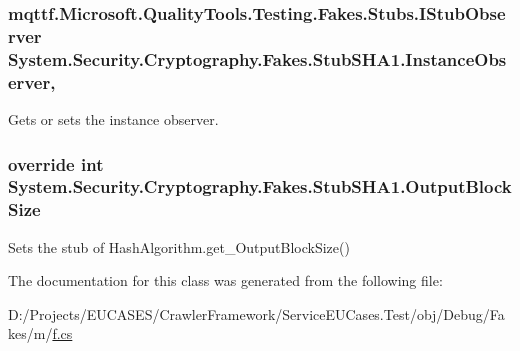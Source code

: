\hypertarget{class_system_1_1_security_1_1_cryptography_1_1_fakes_1_1_stub_s_h_a1_a86fe0dfcf4365a993f78b9d2e08ce7b4}{
\subsubsection[{Instance\-Observer}]{\setlength{\rightskip}{0pt plus 5cm}mqttf.\-Microsoft.\-Quality\-Tools.\-Testing.\-Fakes.\-Stubs.\-I\-Stub\-Observer System.\-Security.\-Cryptography.\-Fakes.\-Stub\-S\-H\-A1.\-Instance\-Observer\hspace{0.3cm}{\ttfamily [get]}, {\ttfamily [set]}}}\label{class_system_1_1_security_1_1_cryptography_1_1_fakes_1_1_stub_s_h_a1_a86fe0dfcf4365a993f78b9d2e08ce7b4}


Gets or sets the instance observer.

\hypertarget{class_system_1_1_security_1_1_cryptography_1_1_fakes_1_1_stub_s_h_a1_a8833400a99719751f6b8841173c7b070}{
\subsubsection[{Output\-Block\-Size}]{\setlength{\rightskip}{0pt plus 5cm}override int System.\-Security.\-Cryptography.\-Fakes.\-Stub\-S\-H\-A1.\-Output\-Block\-Size\hspace{0.3cm}{\ttfamily [get]}}}\label{class_system_1_1_security_1_1_cryptography_1_1_fakes_1_1_stub_s_h_a1_a8833400a99719751f6b8841173c7b070}


Sets the stub of Hash\-Algorithm.\-get\-\_\-\-Output\-Block\-Size()



The documentation for this class was generated from the following file\-:\begin{DoxyCompactItemize}
\item 
D\-:/\-Projects/\-E\-U\-C\-A\-S\-E\-S/\-Crawler\-Framework/\-Service\-E\-U\-Cases.\-Test/obj/\-Debug/\-Fakes/m/\hyperlink{m_2f_8cs}{f.\-cs}\end{DoxyCompactItemize}
